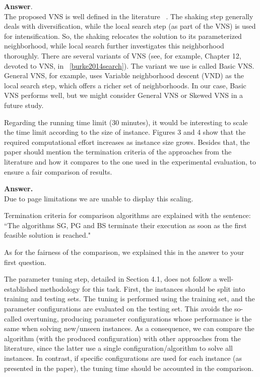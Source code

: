 \documentclass [11pt]{scrartcl}
\begin{document}
	\textbf{Answer}. \\
	The proposed VNS is well defined in the literature ~\cite{mladenovic1997variable}. 
	The shaking step generally deals with diversification, while the local search step (as part of the VNS) is used for intensification. So, the shaking relocates the solution to its parameterized neighborhood, while local search further investigates this neighborhood thoroughly. 
	There are several variants of VNS (see, for example, Chapter 12, devoted to VNS, in ~\ref{burke2014search}). The variant we use is called Basic VNS. General VNS, for example, uses Variable neighborhood descent (VND) as the local search step, which offers a richer set of neighborhoods. 
	In our case, Basic VNS performs well, but we might consider General VNS or Skewed VNS in a future study. 

\begin{leftbar}
Regarding the running time limit (30 minutes), it would be interesting to scale the time limit according to the size of instance. Figures 3 and 4 show that the required computational effort increases as instance size grows. Besides that, the paper should mention the termination criteria of the approaches from the literature and how it compares to the one used in the experimental evaluation, to ensure a fair comparison of results.	
\end{leftbar}

\textbf{Answer.}\\ 
Due to page limitations we are unable to display this scaling. 

Termination criteria for comparison algorithms are explained with the sentence:
``The algorithms SG, PG and BS terminate their execution as soon as the first feasible solution is reached."

As for the fairness of the comparison, we explained this in the answer to your first question.

\begin{leftbar}
The parameter tuning step, detailed in Section 4.1, does not follow a well-established methodology for this task. First, the instances should be split into training and testing sets. The tuning is performed using the training set, and the parameter configurations are evaluated on the testing set. This avoids the so-called overtuning, producing parameter configurations whose performance is the same when solving new/unseen instances. As a consequence, we can compare the algorithm (with the produced configuration) with other approaches from the literature, since the latter use a single configuration/algorithm to solve all instances. In contrast, if specific configurations are used for each instance (as presented in the paper), the tuning time should be accounted in the comparison.
	
\end{leftbar}
\end{document}
